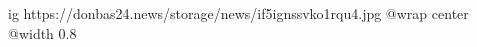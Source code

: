  
 
 
 
 

\ifcmt
  ig https://donbas24.news/storage/news/if5ignssvko1rqu4.jpg
  @wrap center
  @width 0.8
\fi
